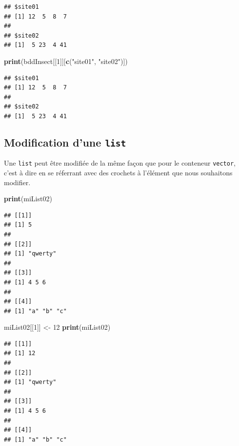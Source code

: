 \documentclass[]{book}
\newenvironment{Shaded}{\begin{snugshade}}{\end{snugshade}}
\newcommand{\KeywordTok}[1]{\textcolor[rgb]{0.13,0.29,0.53}{\textbf{#1}}}
\newcommand{\DecValTok}[1]{\textcolor[rgb]{0.00,0.00,0.81}{#1}}
\newcommand{\StringTok}[1]{\textcolor[rgb]{0.31,0.60,0.02}{#1}}
\newcommand{\NormalTok}[1]{#1}
\begin{document}
\begin{verbatim}
## $site01
## [1] 12  5  8  7
## 
## $site02
## [1]  5 23  4 41
\end{verbatim}

\begin{Shaded}
\begin{Highlighting}[]
\KeywordTok{print}\NormalTok{(bddInsect[[}\DecValTok{1}\NormalTok{]][}\KeywordTok{c}\NormalTok{(}\StringTok{"site01"}\NormalTok{, }\StringTok{"site02"}\NormalTok{)])}
\end{Highlighting}
\end{Shaded}

\begin{verbatim}
## $site01
## [1] 12  5  8  7
## 
## $site02
## [1]  5 23  4 41
\end{verbatim}

\subsection{\texorpdfstring{Modification d'une
\texttt{list}}{Modification d'une list}}\label{modification-dune-list}

Une \texttt{list} peut être modifiée de la même façon que pour le
conteneur \texttt{vector}, c'est à dire en se réferrant avec des
crochets à l'élément que nous souhaitons modifier.

\begin{Shaded}
\begin{Highlighting}[]
\KeywordTok{print}\NormalTok{(miList02)}
\end{Highlighting}
\end{Shaded}

\begin{verbatim}
## [[1]]
## [1] 5
## 
## [[2]]
## [1] "qwerty"
## 
## [[3]]
## [1] 4 5 6
## 
## [[4]]
## [1] "a" "b" "c"
\end{verbatim}

\begin{Shaded}
\begin{Highlighting}[]
\NormalTok{miList02[[}\DecValTok{1}\NormalTok{]] <-}\StringTok{ }\DecValTok{12}
\KeywordTok{print}\NormalTok{(miList02)}
\end{Highlighting}
\end{Shaded}

\begin{verbatim}
## [[1]]
## [1] 12
## 
## [[2]]
## [1] "qwerty"
## 
## [[3]]
## [1] 4 5 6
## 
## [[4]]
## [1] "a" "b" "c"
\end{verbatim}
\end{document}
